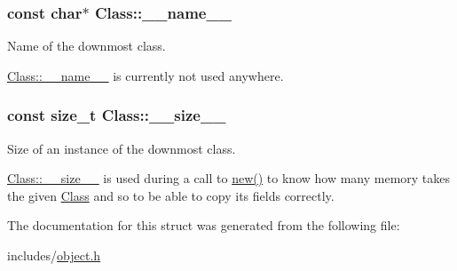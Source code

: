 \subsubsection[{\texorpdfstring{\+\_\+\+\_\+name\+\_\+\+\_\+}{\_\_name\_\_}}]{\setlength{\rightskip}{0pt plus 5cm}const char$\ast$ Class\+::\+\_\+\+\_\+name\+\_\+\+\_\+}\hypertarget{structClass_a24cc8ca77df58f6c3c1369cef0e28f25}{}\label{structClass_a24cc8ca77df58f6c3c1369cef0e28f25}


Name of the downmost class. 

\hyperlink{structClass_a24cc8ca77df58f6c3c1369cef0e28f25}{Class\+::\+\_\+\+\_\+name\+\_\+\+\_\+} is currently not used anywhere. 
\subsubsection[{\texorpdfstring{\+\_\+\+\_\+size\+\_\+\+\_\+}{\_\_size\_\_}}]{\setlength{\rightskip}{0pt plus 5cm}const size\+\_\+t Class\+::\+\_\+\+\_\+size\+\_\+\+\_\+}\hypertarget{structClass_a8a34012f942d8eb18fbd6fbe8dc93427}{}\label{structClass_a8a34012f942d8eb18fbd6fbe8dc93427}


Size of an instance of the downmost class. 

\hyperlink{structClass_a8a34012f942d8eb18fbd6fbe8dc93427}{Class\+::\+\_\+\+\_\+size\+\_\+\+\_\+} is used during a call to \hyperlink{new_8c_a01e9717d9b65b0549d34b2c983800872}{new()} to know how many memory takes the given \hyperlink{structClass}{Class} and so to be able to copy its fields correctly. 

The documentation for this struct was generated from the following file\+:\begin{DoxyCompactItemize}
\item 
includes/\hyperlink{object_8h}{object.\+h}\end{DoxyCompactItemize}
